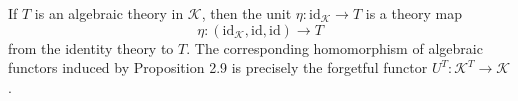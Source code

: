 If $T$ is an algebraic theory in $\mathcal{K}$, then the unit $\eta: \mathrm{id}_\mathcal{K} \longrightarrow T$ is a theory map
$$
\eta: (\mathrm{id}_\mathcal{K}, \mathrm{id}, \mathrm{id}) \longrightarrow T
$$
from the identity theory to $T$. The corresponding homomorphism of algebraic functors induced by Proposition 2.9 is precisely the forgetful functor $U^T: \mathcal{K}^T \longrightarrow \mathcal{K}$.
